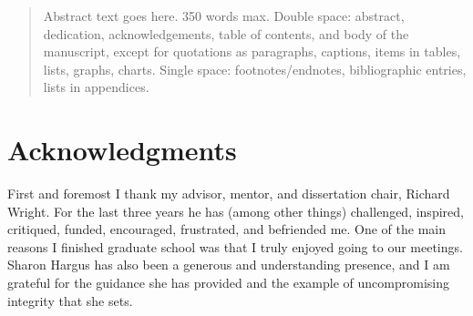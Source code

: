 \thispagestyle{empty}

\begin{abstract}
Abstract text goes here.  350 words max.  Double space: abstract, dedication, acknowledgements, table of contents, and body of the manuscript, except for quotations as paragraphs, captions, items in tables, lists, graphs, charts. Single space: footnotes/endnotes, bibliographic entries, lists in appendices.
\end{abstract}

\tableofcontents

\listoffigures

\listoftables

\listoflistings %

\chapter*{Acknowledgments}
First and foremost I thank my advisor, mentor, and dissertation chair, Richard Wright.  For the last three years he has (among other things) challenged, inspired, critiqued, funded, encouraged, frustrated, and befriended me.  One of the main reasons I finished graduate school was that I truly enjoyed going to our meetings.  Sharon Hargus has also been a generous and understanding presence, and I am grateful for the guidance she has provided and the example of uncompromising integrity that she sets.

